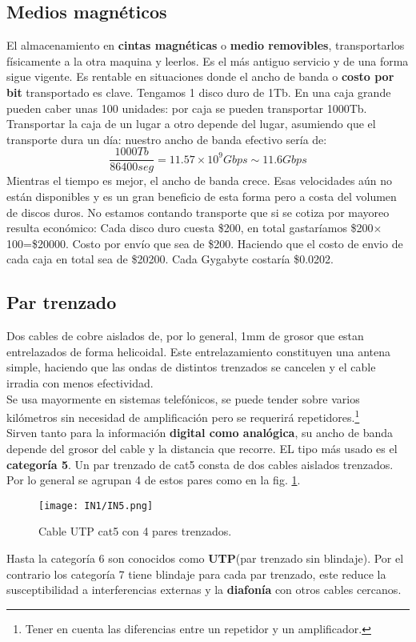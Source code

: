 \documentclass[
	12pt, %
	fleqn, %
	a4paper, %
	oneside, %
]{LegrandOrangeBook}
\begin{document}
\subsection{Medios magnéticos}
El almacenamiento en \textbf{cintas magnéticas} o \textbf{medio removibles}, transportarlos físicamente a la otra maquina y leerlos. Es el más antiguo servicio y de una forma sigue vigente. Es rentable en situaciones donde el ancho de banda o \textbf{costo por bit} transportado es clave. Tengamos 1 disco duro de 1Tb. En una caja grande pueden caber unas 100 unidades: por caja se pueden transportar 1000Tb. Transportar la caja de un lugar a otro depende del lugar, asumiendo que el transporte dura un día: nuestro ancho de banda efectivo sería de:
\begin{displaymath}
\frac{1000Tb}{86400seg}=11.57\times 10^9 Gbps\sim 11.6 Gbps
\end{displaymath}
Mientras el tiempo es mejor, el ancho de banda crece. Esas velocidades aún no están disponibles y es un gran beneficio de esta forma pero a costa del volumen de discos duros. No estamos contando transporte que si se cotiza por mayoreo resulta económico: Cada disco duro cuesta \$200, en total gastaríamos \$200$\times$100=\$20000. Costo por envío que sea de \$200. Haciendo que el costo de envio de cada caja en total sea de \$20200. Cada Gygabyte costaría \$0.0202.
\subsection{Par trenzado}
Dos cables de cobre aislados de, por lo general, 1mm de grosor que estan entrelazados de forma helicoidal. Este entrelazamiento constituyen una antena simple, haciendo que las ondas de distintos trenzados se cancelen y el cable irradia con menos efectividad.\\
Se usa mayormente en sistemas telefónicos, se puede tender sobre varios kilómetros sin necesidad de amplificación pero se requerirá repetidores.\footnote{Tener en cuenta las diferencias entre un repetidor y un amplificador.}\\
Sirven tanto para la información \textbf{digital como analógica}, su ancho de banda depende del grosor del cable y la distancia que recorre. EL tipo más usado es el \textbf{categoría 5}. Un par trenzado de cat5 consta de dos cables aislados trenzados. Por lo general se agrupan 4 de estos pares como en la fig. \ref{fig:utp cat 5}.
\begin{figure}[H]
\centering
\texttt{[image: IN1/IN5.png]}
\caption{Cable UTP cat5 con 4 pares trenzados.}
\label{fig:utp cat 5}
\end{figure}
Hasta la categoría 6 son conocidos como \textbf{UTP}(par trenzado sin blindaje). Por el contrario los categoría 7 tiene blindaje para cada par trenzado, este reduce la susceptibilidad a interferencias externas y la \textbf{diafonía} con otros cables cercanos.
\end{document}
